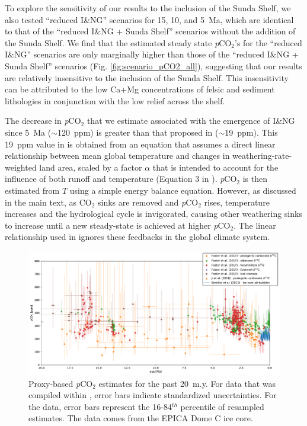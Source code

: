\documentclass[11pt,letterpaper]{article}
\newcommand{\pCOtwo}{\textit{p}CO$_{2}$\xspace}
\newcommand{\COtwo}{CO$_{2}$\xspace}
\begin{document}
To explore the sensitivity of our results to the inclusion of the Sunda Shelf, we also tested ``reduced I\&NG'' scenarios for 15, 10, and 5~Ma, which are identical to that of the ``reduced I\&NG + Sunda Shelf'' scenarios without the addition of the Sunda Shelf. We find that the estimated steady state \pCOtwo's for the ``reduced I\&NG'' scenarios are only marginally higher than those of the ``reduced I\&NG + Sunda Shelf'' scenarios (Fig. \ref{fig:scenario_pCO2_all}), suggesting that our results are relatively insensitive to the inclusion of the Sunda Shelf. This insensitivity can be attributed to the low Ca+Mg concentrations of felsic and sediment lithologies in conjunction with the low relief across the shelf.

The decrease in \pCOtwo that we estimate associated with the emergence of I\&NG since 5~Ma ($\sim$120~ppm) is greater than that proposed in \citet{Molnar2015a} ($\sim$19~ppm). This 19~ppm value in \citet{Molnar2015a} is obtained from an equation that assumes a direct linear relationship between mean global temperature and changes in weathering-rate-weighted land area, scaled by a factor $\alpha$ that is intended to account for the influence of both runoff and temperature (Equation 3 in \citealp{Molnar2015a}). \pCOtwo is then estimated from $T$ using a simple energy balance equation. However, as discussed in the main text, as \COtwo sinks are removed and \pCOtwo rises, temperature increases and the hydrological cycle is invigorated, causing other weathering sinks to increase until a new steady-state is achieved at higher \pCOtwo. The linear relationship used in \citet{Molnar2015a} ignores these feedbacks in the global climate system.

\begin{figure}[h!]
    \centering
    \includegraphics[width=1\textwidth]{Manuscript/Figures/pCO2_proxies.pdf}
    \caption{Proxy-based \pCOtwo estimates for the past 20~m.y. For data that was compiled within \citet{Foster2017a}, error bars indicate standardized uncertainties. For the \citet{Ji2018a} data, error bars represent the 16-84$^{th}$ percentile of resampled estimates. The \citet{Bereiter2015a} data comes from the EPICA Dome C ice core.}
    \label{fig:pCO2_proxies}
\end{figure}
\end{document}
